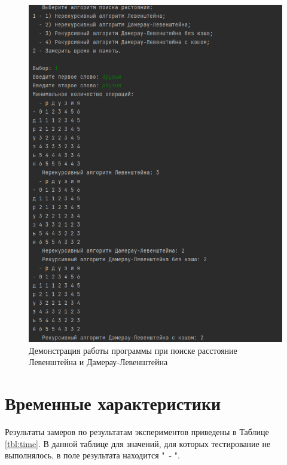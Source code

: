 \begin{figure}[h]
	\centering
	\includegraphics[height=0.4\textheight]{img/example.png}
	\caption{Демонстрация работы программы при поиске расстояние Левенштейна и Дамерау-Левенштейна}
	\label{img:demonstration}
\end{figure}

\clearpage

\section{Временные характеристики}

Результаты замеров по результатам экспериментов приведены в Таблице \ref{tbl:time}. В данной таблице для значений, для которых тестирование не выполнялось, в поле результата находится "\ - ".

